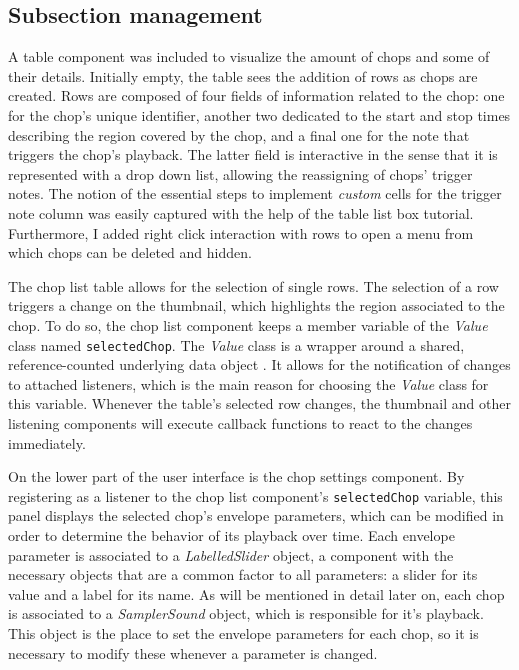 \documentclass[12pt, a4paper, hidelinks]{article}
\begin{document}
	
	\subsection{Subsection management}
    A table component was included to visualize the amount of chops and some of their details. Initially empty, the table sees the addition of rows as chops are created. Rows are composed of four fields of information related to the chop: one for the chop's unique identifier, another two dedicated to the start and stop times describing the region covered by the chop, and a final one for the note that triggers the chop's playback.
    The latter field is interactive in the sense that it is represented with a drop down list, allowing the reassigning of chops' trigger notes. The notion of the essential steps to implement \textit{custom} cells for the trigger note column was easily captured with the help of the table list box tutorial\cite{tablelistbox}. Furthermore, I added right click interaction with rows to open a menu from which chops can be deleted and hidden.\par %
    
	The chop list table allows for the selection of single rows. The selection of a row triggers a change on the thumbnail, which highlights the region associated to the chop. To do so, the chop list component keeps a member variable of the \textit{Value} class named \texttt{selectedChop}. The \textit{Value} class is a wrapper around a shared, reference-counted underlying data object \cite{value}. It allows for the notification of changes to attached listeners, which is the main reason for choosing the \textit{Value} class for this variable. Whenever the table's selected row changes, the thumbnail and other listening components will execute callback functions to react to the changes immediately. \par
	
	On the lower part of the user interface is the chop settings component. By registering as a listener to the chop list component's \texttt{selectedChop} variable, this panel displays the selected chop's envelope parameters, which can be modified in order to determine the behavior of its playback over time. Each envelope parameter is associated to a \textit{LabelledSlider} object, a component with the necessary objects that are a common factor to all parameters: a slider for its value and a label for its name. As will be mentioned in detail later on, each chop is associated to a \textit{SamplerSound} object, which is responsible for it's playback. This object is the place to set the envelope parameters for each chop, so it is necessary to modify these whenever a parameter is changed. \par
	
\end{document}
